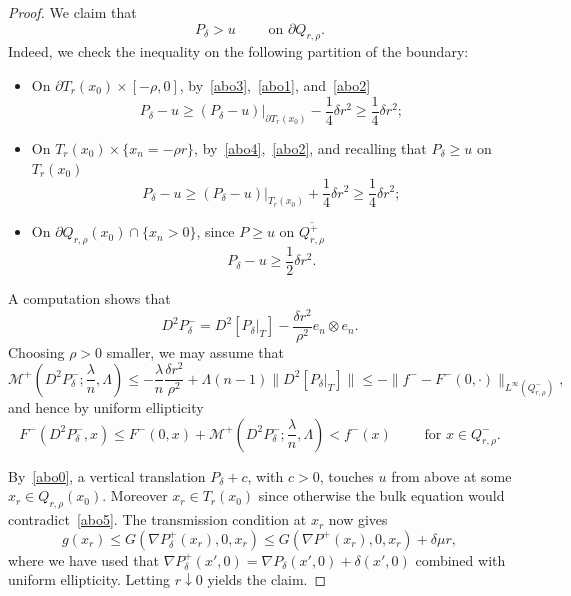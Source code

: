 \documentclass[letter,11pt]{amsart}
\newcommand{\mcal}{\mathcal{M}}
\theoremstyle{definition}
\numberwithin{equation}{section}
\begin{document}
\begin{proof}
We claim that 
\begin{equation}
\label{abo0}
P_{\delta} > u \qquad \text{ on } \partial Q_{r,\rho}.
\end{equation}
Indeed, we check the inequality on the following partition of the boundary:
\begin{itemize}
\item 
On $\partial T_{r}(x_0) \times [-\rho, 0]$, by~\eqref{abo3},~\eqref{abo1}, and~\eqref{abo2}
\[
P_{\delta} - u \geq (P_{\delta} - u)|_{\partial T_{r}(x_0)} - \frac{1}{4} \delta r^2 \geq \frac{1}{4} \delta r^2;
\]
\item On $T_r (x_0) \times \{x_n = - \rho r\}$, by~\eqref{abo4},~\eqref{abo2}, and recalling that $P_{\delta} \geq u$ on $T_{r}(x_0)$
\[
P_{\delta} - u \geq (P_{\delta} - u)|_{T_{r}(x_0)} + \frac{1}{4} \delta r^2 \geq \frac{1}{4} \delta r^2;
\]
\item On $\partial Q_{r,\rho}(x_0) \cap \{x_n > 0\}$, since $P \geq u$ on $\overline{Q_{r,\rho}^{+}}$
\[
P_{\delta} - u \geq \frac{1}{2}\delta r^2.
\]
\end{itemize}

\medskip

A computation shows that
\[
D^2 P_{\delta}^{-} = D^2 [P_{\delta}|_{T}] - \frac{\delta r^2}{\rho^2} e_n \otimes e_n.
\]
Choosing $\rho > 0$ smaller, we may assume that
\[
\mcal^{+}(D^2 P_{\delta}^{-}; \textstyle \frac{\lambda}{n}, \Lambda)
\leq \displaystyle- \frac{\lambda}{n}\frac{\delta r^2}{\rho^2} + \Lambda(n-1) \|D^2 [P_{\delta}|_{T}]\|
\leq - \|f^{-} - F^{-}(0,\cdot)\|_{L^{\infty}(Q_{r,\rho}^{-})},
\]
and hence by uniform ellipticity
\begin{equation}
\label{abo5}
F^{-}(D^2 P_{\delta}^{-}, x) \leq F^{-}(0, x) + \mcal^{+}(D^2 P_{\delta}^{-}; \textstyle \frac{\lambda}{n}, \Lambda) < f^{-}(x) \qquad \text{ for } x \in Q_{r,\rho}^{-}.
\end{equation}

By~\eqref{abo0}, a vertical translation $P_{\delta} + c$, with $c > 0$, touches $u$ from above at some $x_r \in Q_{r,\rho}(x_0)$.
Moreover $x_r \in T_r(x_0)$ since otherwise the bulk equation would contradict~\eqref{abo5}.
The transmission condition at $x_r$ now gives
\[
g(x_r) \leq G(\nabla P_{\delta}^{+}(x_r), 0, x_r) \leq G(\nabla P^{+}(x_r), 0, x_r) + \delta \mu r,
\]
where we have used that $\nabla P_{\delta}^{+}(x',0) = \nabla P_{\delta}(x',0) + \delta (x',0)$ combined with uniform ellipticity.
Letting $r \downarrow 0$ yields the claim.
\end{proof}
\end{document}
